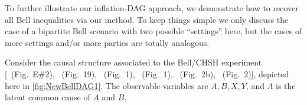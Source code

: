 To further illustrate our inflation-DAG approach, we demonstrate how to recover all Bell inequalities \cite{Brunner2013Bell,bell1966lhvm,CHSHOriginal} via our method. To keep things simple we only discuss the case of a bipartite Bell scenario with two possible ``settings'' here, but the cases of more settings and/or more parties are totally analogous.

Consider the causal structure associated to the Bell/CHSH \cite{bell1964einstein,Brunner2013Bell,bell1966lhvm,CHSHOriginal} experiment [\citealp{pusey2014gdag}~(Fig.~E\#2), \citealp{WoodSpekkens}~(Fig.~19), \citealp{chaves2014novel}~(Fig.~1), \citealp{BeyondBellII}~(Fig.~1), \citealp{wolfe2015nonconvexity}~(Fig.~2b), \citealp{steeg2011relaxation}~(Fig.~2)], depicted here in \cref{fig:NewBellDAG1}. The observable variables are $A,B,X,Y$, and $\Lambda$ is the latent common cause of $A$ and $B$.

